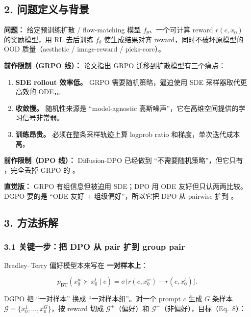 \subsection{2. 问题定义与背景}

\textbf{问题：} 给定预训练扩散 / flow-matching 模型 $f_\theta$、一个可计算 reward $r(c,x_0)$ 的奖励模型，用 RL 去后训练 $f_\theta$ 使生成结果对齐 reward，同时不破坏原模型的 OOD 质量（aesthetic / image-reward / picks-core）。

\textbf{前作限制（GRPO 线）：} 论文指出 GRPO 迁移到扩散模型有三个痛点：

\begin{enumerate}[leftmargin=1.5em]
  \item \textbf{SDE rollout 效率低。} GRPO 需要随机策略，逼迫使用 SDE 采样器取代更高效的 ODE，。
  \item \textbf{收敛慢。} 随机性来源是 ``model-agnostic 高斯噪声''，它在高维空间提供的学习信号非常弱。
  \item \textbf{训练昂贵。} 必须在整条采样轨迹上算 logprob ratio 和梯度，单次迭代成本高。
\end{enumerate}

\textbf{前作限制（DPO 线）：} Diffusion-DPO 已经做到 ``不需要随机策略''，但它只有 ，完全丢掉 GRPO 的 。

\begin{intubox}
\textbf{直觉版：} GRPO 有组信息但被迫用 SDE；DPO 用 ODE 友好但只认两两比较。DGPO 要的是 ``ODE 友好 + 组级偏好''，所以它把 DPO 从 pairwise 扩到 。
\end{intubox}

\subsection{3. 方法拆解}

\subsubsection{3.1 关键一步：把 DPO 从 pair 扩到 group pair}

Bradley--Terry 偏好模型本来写在 \textbf{一对样本上}：

\[
p_{\text{BT}}(x_0^w\succ x_0^l\mid c) = \sigma\bigl(r(c,x_0^w)-r(c,x_0^l)\bigr).
\]

DGPO 把 ``一对样本'' 换成 ``一对样本组''。对一个 prompt $c$ 生成 $G$ 条样本 $\mathcal{G}=\{x_0^1,\ldots,x_0^G\}$，按 reward 切成 $\mathcal{G}^{+}$（偏好）和 $\mathcal{G}^{-}$（非偏好），目标（Eq.~8）：

